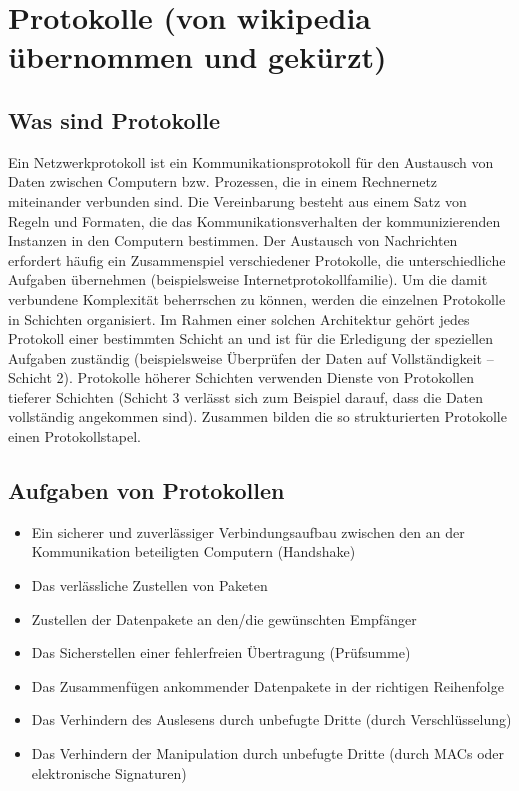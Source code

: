 \chapter{Protokolle (von wikipedia übernommen und gekürzt)}
\section{Was sind Protokolle}
Ein Netzwerkprotokoll ist ein Kommunikationsprotokoll für den Austausch von Daten zwischen Computern bzw. Prozessen, die in einem Rechnernetz miteinander verbunden sind. Die Vereinbarung besteht aus einem Satz von Regeln und Formaten, die das Kommunikationsverhalten der kommunizierenden Instanzen in den Computern bestimmen. Der Austausch von Nachrichten erfordert häufig ein Zusammenspiel verschiedener Protokolle, die unterschiedliche Aufgaben übernehmen (beispielsweise Internetprotokollfamilie). Um die damit verbundene Komplexität beherrschen zu können, werden die einzelnen Protokolle in Schichten organisiert. Im Rahmen einer solchen Architektur gehört jedes Protokoll einer bestimmten Schicht an und ist für die Erledigung der speziellen Aufgaben zuständig (beispielsweise Überprüfen der Daten auf Vollständigkeit – Schicht 2). Protokolle höherer Schichten verwenden Dienste von Protokollen tieferer Schichten (Schicht 3 verlässt sich zum Beispiel darauf, dass die Daten vollständig angekommen sind). Zusammen bilden die so strukturierten Protokolle einen Protokollstapel.
\section{Aufgaben von Protokollen}
\begin{itemize}
\item Ein sicherer und zuverlässiger Verbindungsaufbau zwischen den an der Kommunikation beteiligten Computern (Handshake)
\item Das verlässliche Zustellen von Paketen
\item Zustellen der Datenpakete an den/die gewünschten Empfänger
\item Das Sicherstellen einer fehlerfreien Übertragung (Prüfsumme)
\item Das Zusammenfügen ankommender Datenpakete in der richtigen Reihenfolge
\item Das Verhindern des Auslesens durch unbefugte Dritte (durch Verschlüsselung) 
\item Das Verhindern der Manipulation durch unbefugte Dritte (durch MACs oder elektronische Signaturen)
\end{itemize}
